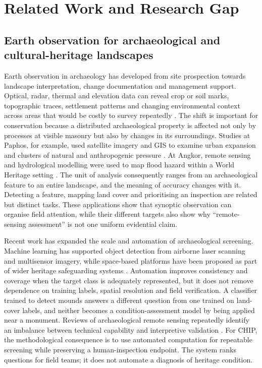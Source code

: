 \section{Related Work and Research Gap}\label{sec:related-work}

\subsection{Earth observation for archaeological and cultural-heritage landscapes}

Earth observation in archaeology has developed from site prospection towards landscape interpretation, change documentation and management support. Optical, radar, thermal and elevation data can reveal crop or soil marks, topographic traces, settlement patterns and changing environmental context across areas that would be costly to survey repeatedly \citep{lasaponara2011satellite,tapete2018geosciences,opitz2018trends,yao2023overview}. The shift is important for conservation because a distributed archaeological property is affected not only by processes at visible masonry but also by changes in its surroundings. Studies at Paphos, for example, used satellite imagery and GIS to examine urban expansion and clusters of natural and anthropogenic pressure \citep{agapiou2015paphos,agapiou2016paphos}. At Angkor, remote sensing and hydrological modelling were used to map flood hazard within a World Heritage setting \citep{liu2019angkor}. The unit of analysis consequently ranges from an archaeological feature to an entire landscape, and the meaning of accuracy changes with it. Detecting a feature, mapping land cover and prioritising an inspection are related but distinct tasks. These applications show that synoptic observation can organise field attention, while their different targets also show why ``remote-sensing assessment'' is not one uniform evidential claim.

Recent work has expanded the scale and automation of archaeological screening. Machine learning has supported object detection from airborne laser scanning and multisensor imagery, while space-based platforms have been proposed as part of wider heritage safeguarding systems \citep{lambers2019ml,orengo2020mounds,argyrou2022review,luo2023space}. Automation improves consistency and coverage when the target class is adequately represented, but it does not remove dependence on training labels, spatial resolution and field verification. A classifier trained to detect mounds answers a different question from one trained on land-cover labels, and neither becomes a condition-assessment model by being applied near a monument. Reviews of archaeological remote sensing repeatedly identify an imbalance between technical capability and interpretive validation \citep{opitz2018trends,argyrou2022review}. For CHIP, the methodological consequence is to use automated computation for repeatable screening while preserving a human-inspection endpoint. The system ranks questions for field teams; it does not automate a diagnosis of heritage condition.

